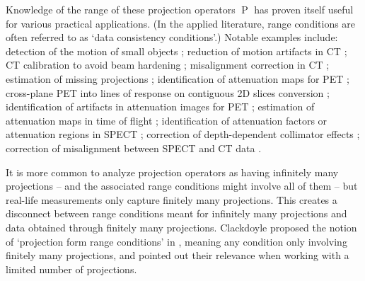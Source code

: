 \documentclass[12pt]{article}
\DeclareMathOperator{\Projbasic}{P}
\begin{document}


Knowledge of the range of these projection operators $\Projbasic$  has proven itself useful for various practical applications. (In the applied literature, range conditions are often referred to as `data consistency conditions'.) Notable examples include: 
detection of the motion of small objects \cite{clackdoyle:hal-01967298}; reduction of motion artifacts in CT \cite{1637536,mouchet:hal-03511400};
CT calibration to avoid beam hardening \cite{8364614}; misalignment correction in CT \cite{lesaint:hal-01686646,desbat:hal-03099405, Luo_data_sustained_misalignment,
nguyen:hal-03101279};
estimation of missing projections \cite{Michel_Defrise_2003, new_data_consistency_fanbeam, Ma2017JohnsEC};
identification of attenuation maps for PET \cite{https://doi.org/10.1002/mma.1670150504,737676,6857b0c455474528a1ce35ccfeea3d3b,1208606}; cross-plane PET into lines of response on contiguous 2D slices conversion \cite{M_Defrise_1995,Michel_Defrise_1999}; identification of artifacts in attenuation images for PET \cite{1596627}; estimation of attenuation maps in time of flight \cite{Defrise2012TimeofflightPD};
identification of attenuation factors or attenuation regions in SPECT \cite{1573668924263339008,F_Natterer_1993, Welch_towards_accurate_attenuation_correction_in_spect, C_Mennessier_1999};
correction of depth-dependent collimator effects \cite{301464,293929};
correction of misalignment between SPECT and  CT data \cite{Wells104,https://doi.org/10.1002/mp.15058_2021}.


It is more common to analyze projection operators as having infinitely many projections -- and the associated range conditions might involve all of them -- but real-life measurements only capture finitely many projections. This creates a disconnect between range conditions meant for infinitely many projections and data obtained through finitely many projections. 
Clackdoyle proposed the notion of `projection form range conditions' in \cite{6495510}, meaning any condition only involving finitely many projections, and pointed out their relevance when working with a limited number of projections. 
\end{document}
